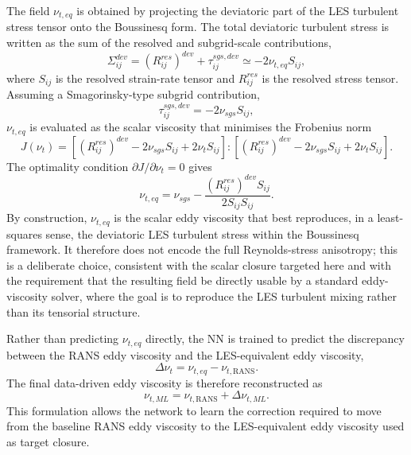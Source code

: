 The field $\nu_{t,eq}$ is obtained by projecting the deviatoric part of the LES turbulent stress tensor onto the Boussinesq form. The total deviatoric turbulent stress is written as the sum of the resolved and subgrid-scale contributions,
\begin{equation}
    \Sigma_{ij}^{dev} =
    \left(R_{ij}^{res}\right)^{dev} + \tau_{ij}^{sgs,dev}
    \simeq -2 \nu_{t,eq} S_{ij},
\end{equation}
where $S_{ij}$ is the resolved strain-rate tensor and $R_{ij}^{res}$ is the resolved stress tensor. Assuming a Smagorinsky-type subgrid contribution,
\begin{equation}
    \tau_{ij}^{sgs,dev} = -2 \nu_{sgs} S_{ij},
\end{equation}
$\nu_{t,eq}$ is evaluated as the scalar viscosity that minimises the Frobenius norm
\begin{equation}
    J(\nu_t) =
    \left[
    \left(R_{ij}^{res}\right)^{dev}
    -2\nu_{sgs}S_{ij}
    +2\nu_t S_{ij}
    \right]
    :
    \left[
    \left(R_{ij}^{res}\right)^{dev}
    -2\nu_{sgs}S_{ij}
    +2\nu_t S_{ij}
    \right].
\end{equation}
The optimality condition $\partial J/\partial \nu_t=0$ gives
\begin{equation}
    \nu_{t,eq}
    =
    \nu_{sgs}
    -
    \frac{\left(R_{ij}^{res}\right)^{dev}S_{ij}}
    {2S_{ij}S_{ij}} .
\end{equation}
By construction, $\nu_{t,eq}$ is the scalar eddy viscosity that best reproduces, in a least-squares sense, the deviatoric LES turbulent stress within the Boussinesq framework. It therefore does not encode the full Reynolds-stress anisotropy; this is a deliberate choice, consistent with the scalar closure targeted here and with the requirement that the resulting field be directly usable by a standard eddy-viscosity solver, where the goal is to reproduce the LES turbulent mixing rather than its tensorial structure.

Rather than predicting $\nu_{t,eq}$ directly, the NN is trained to predict the discrepancy between the RANS eddy viscosity and the LES-equivalent eddy viscosity,
\begin{equation}
    \Delta \nu_t = \nu_{t,eq} - \nu_{t,\mathrm{RANS}}.
\end{equation}
The final data-driven eddy viscosity is therefore reconstructed as
\begin{equation}
    \nu_{t,ML} = \nu_{t,\mathrm{RANS}} + \Delta \nu_{t,ML}.
\end{equation}
This formulation allows the network to learn the correction required to move from the baseline RANS eddy viscosity to the LES-equivalent eddy viscosity used as target closure.


